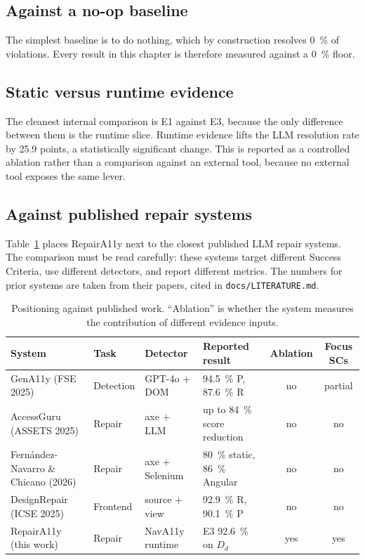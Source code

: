 \documentclass[11pt]{article}
\newcommand{\Dd}{\ensuremath{D_d}}
\begin{document}
\subsection{Against a no-op baseline}

The simplest baseline is to do nothing, which by construction resolves
\SI{0}{\percent} of violations. Every result in this chapter is therefore measured
against a \SI{0}{\percent} floor.

\subsection{Static versus runtime evidence}

The cleanest internal comparison is E1 against E3, because the only difference between
them is the runtime slice. Runtime evidence lifts the LLM resolution rate by 25.9
points, a statistically significant change. This is reported as a controlled ablation
rather than a comparison against an external tool, because no external tool exposes
the same lever.

\subsection{Against published repair systems}

Table~\ref{tab:related} places RepairA11y next to the closest published LLM repair
systems. The comparison must be read carefully: these systems target different Success
Criteria, use different detectors, and report different metrics. The numbers for prior
systems are taken from their papers, cited in \texttt{docs/LITERATURE.md}.

\begin{table}[h]
\centering
\caption{Positioning against published work. ``Ablation'' is whether the system
measures the contribution of different evidence inputs.}
\label{tab:related}
\begin{tabular}{p{3.2cm}p{1.8cm}p{2.2cm}p{2.6cm}cc}
\toprule
System & Task & Detector & Reported result & Ablation & Focus SCs \\
\midrule
GenA11y (FSE 2025) & Detection & GPT-4o + DOM & \SI{94.5}{\percent} P, \SI{87.6}{\percent} R & no & partial \\
AccessGuru (ASSETS 2025) & Repair & axe + LLM & up to \SI{84}{\percent} score reduction & no & no \\
Fern\'andez-Navarro \& Chicano (2026) & Repair & axe + Selenium & \SI{80}{\percent} static, \SI{86}{\percent} Angular & no & no \\
DesignRepair (ICSE 2025) & Frontend & source + view & \SI{92.9}{\percent} R, \SI{90.1}{\percent} P & no & no \\
RepairA11y (this work) & Repair & NavA11y runtime & E3 \SI{92.6}{\percent} on \Dd & yes & yes \\
\bottomrule
\end{tabular}
\end{table}
\end{document}
